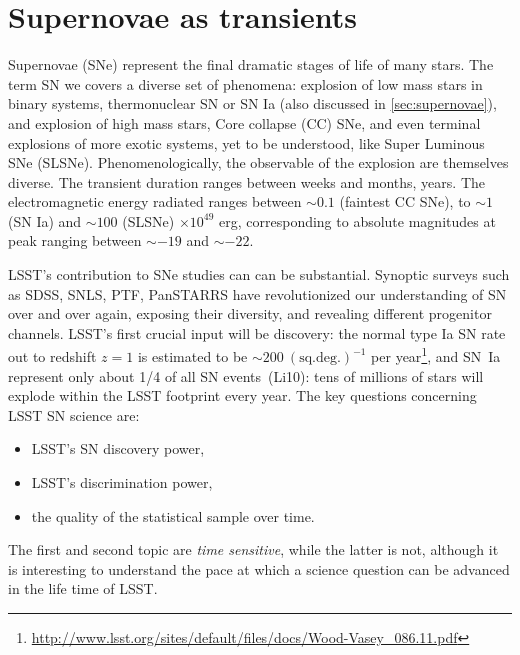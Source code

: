 %
%
%
%
%
%
%
%

\section{Supernovae as transients}
\def\secname{SNtransients}\label{sec:\secname} %


Supernovae (SNe) represent the final dramatic stages of life of many
stars. The term SN we covers a diverse set of phenomena: explosion of
low mass stars in binary systems, thermonuclear SN or SN Ia (also
discussed in \ref{sec:supernovae}), and explosion of high mass stars,
Core collapse (CC) SNe, and even terminal explosions of more exotic
systems, yet to be understood, like Super Luminous SNe
(SLSNe). Phenomenologically, the observable of the explosion are
themselves diverse. The transient duration ranges between weeks and
months, years. The electromagnetic energy radiated ranges between
$\sim0.1$ (faintest CC SNe), to $\sim1$ (SN Ia) and $\sim100$ (SLSNe)
$\times 10^{49}$ erg, corresponding to absolute magnitudes at peak
ranging between $\sim-19$ and $\sim-22$.

LSST's contribution to SNe studies can can be substantial. Synoptic
surveys such as SDSS, SNLS, PTF, PanSTARRS have revolutionized our
understanding of SN over and over again, exposing their diversity,
and revealing different progenitor channels. LSST's first crucial
input will be discovery: the normal type Ia SN rate out to redshift
$z=1$ is estimated to be $\sim200 ~(\mathrm{sq. deg.})^{-1}$ per
year\footnote{\url{http://www.lsst.org/sites/default/files/docs/Wood-Vasey_086.11.pdf}},
and SN~Ia represent only about 1/4 of all SN
events~(Li10): tens of millions of stars will explode
within the LSST footprint every year. The key questions concerning
LSST SN science are:
\begin{itemize}
\item
LSST's SN discovery power, 
\item
LSST's discrimination power, 
\item
the quality of the statistical sample over time. 
\end{itemize}
The first and second topic are \emph{time sensitive}, while the latter
is not, although it is interesting to understand the pace at which a
science question can be advanced in the life time of LSST.

